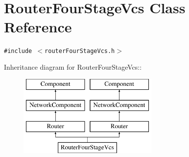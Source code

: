 \hypertarget{classRouterFourStageVcs}{
\section{RouterFourStageVcs Class Reference}
\label{classRouterFourStageVcs}
}
{\tt \#include $<$routerFourStageVcs.h$>$}

Inheritance diagram for RouterFourStageVcs::\begin{figure}[H]
\begin{center}
\leavevmode
\includegraphics[height=4cm]{classRouterFourStageVcs}
\end{center}
\end{figure}
